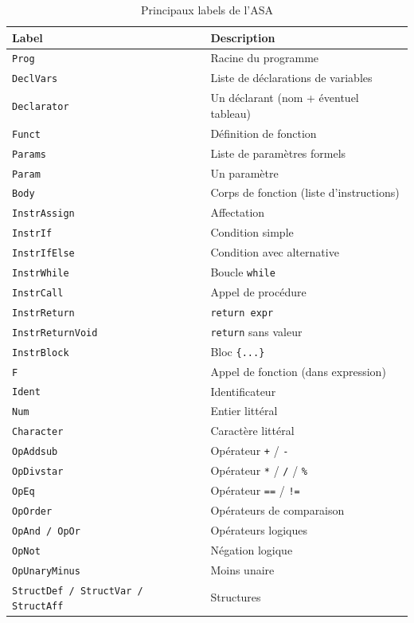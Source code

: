 \documentclass[12pt,a4paper]{article}
\begin{document}
\begin{table}[H]
\centering
\begin{tabularx}{\linewidth}{lX}
\toprule
\textbf{Label} & \textbf{Description} \\
\midrule
\texttt{Prog}          & Racine du programme \\
\texttt{DeclVars}      & Liste de déclarations de variables \\
\texttt{Declarator}    & Un déclarant (nom + éventuel tableau) \\
\texttt{Funct}         & Définition de fonction \\
\texttt{Params}        & Liste de paramètres formels \\
\texttt{Param}         & Un paramètre \\
\texttt{Body}          & Corps de fonction (liste d'instructions) \\
\texttt{InstrAssign}   & Affectation \\
\texttt{InstrIf}       & Condition simple \\
\texttt{InstrIfElse}   & Condition avec alternative \\
\texttt{InstrWhile}    & Boucle \texttt{while} \\
\texttt{InstrCall}     & Appel de procédure \\
\texttt{InstrReturn}   & \texttt{return expr} \\
\texttt{InstrReturnVoid} & \texttt{return} sans valeur \\
\texttt{InstrBlock}    & Bloc \texttt{\{...\}} \\
\texttt{F}             & Appel de fonction (dans expression) \\
\texttt{Ident}         & Identificateur \\
\texttt{Num}           & Entier littéral \\
\texttt{Character}     & Caractère littéral \\
\texttt{OpAddsub}      & Opérateur \texttt{+} / \texttt{-} \\
\texttt{OpDivstar}     & Opérateur \texttt{*} / \texttt{/} / \texttt{\%} \\
\texttt{OpEq}          & Opérateur \texttt{==} / \texttt{!=} \\
\texttt{OpOrder}       & Opérateurs de comparaison \\
\texttt{OpAnd / OpOr}  & Opérateurs logiques \\
\texttt{OpNot}         & Négation logique \\
\texttt{OpUnaryMinus}  & Moins unaire \\
\texttt{StructDef / StructVar / StructAff} & Structures \\
\bottomrule
\end{tabularx}
\caption{Principaux labels de l'ASA}
\end{table}
\end{document}
